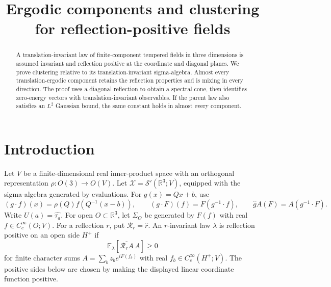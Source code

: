 \documentclass[11pt,letterpaper,reqno]{amsart}
\title[Ergodic components and clustering]
 {Ergodic components and clustering for reflection-positive fields}
\date{}
\newcommand{\R}{\mathbb R}
\newcommand{\E}{\mathbb E}
\begin{document}
\begin{abstract}
A translation-invariant law of finite-component tempered fields in
three dimensions is assumed invariant and reflection positive at the
coordinate and diagonal planes. We prove clustering relative to its
translation-invariant sigma-algebra. Almost every translation-ergodic
component retains the reflection properties and is mixing in every
direction. The proof uses a diagonal reflection to obtain a spectral
cone, then identifies zero-energy vectors with translation-invariant
observables. If the parent law also satisfies an \(L^2\) Gaussian
bound, the same constant holds in almost every component.
\end{abstract}
\maketitle
\tableofcontents
\section{Introduction}\label{sec:introduction}
Let \(V\) be a finite-dimensional real inner-product space with an
orthogonal representation \(\rho:O(3)\to O(V)\). Let
\(\mathcal X=\mathcal S'(\R^3;V)\), equipped with the sigma-algebra
generated by evaluations. For \(g(x)=Qx+b\), use
\begin{equation}\label{eq:euclidean-action}
 (g\cdot f)(x)=\rho(Q)f(Q^{-1}(x-b)),\qquad
 (g\cdot F)(f)=F(g^{-1}\cdot f),\qquad
 \widehat g A(F)=A(g^{-1}\cdot F).
\end{equation}
Write \(U(a)=\widehat{\tau_a}\).
For open \(O\subset\R^3\), let \(\Sigma_O\) be generated by
\(F(f)\) with real \(f\in C_c^\infty(O;V)\).
For a reflection \(r\), put \(\mathcal R_r=\widehat r\).
An \(r\)-invariant law \(\lambda\) is reflection positive on an
open side \(H^+\) if
\[
 \E_\lambda[\overline{\mathcal R_r A}\,A]\ge0
\]
for finite character sums \(A=\sum_bz_be^{iF(f_b)}\) with
real \(f_b\in C_c^\infty(H^+;V)\).
The positive sides below are chosen by making the displayed linear
coordinate function positive.
\end{document}
